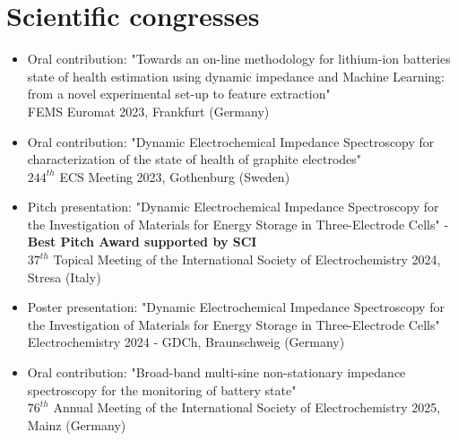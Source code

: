 \section*{Scientific congresses}
\begin{itemize}
\item {\large Oral contribution: "Towards an on-line methodology for lithium-ion batteries state of health estimation using dynamic impedance and Machine Learning: from a novel experimental set-up to feature extraction"}\\
FEMS Euromat 2023, Frankfurt (Germany) 

\item {\large Oral contribution: "Dynamic Electrochemical Impedance Spectroscopy for characterization of the state of health of graphite electrodes"}\\
$\mathrm{244}^{th}$ ECS Meeting 2023, Gothenburg (Sweden)

\item {\large Pitch presentation: "Dynamic Electrochemical Impedance Spectroscopy for the Investigation of Materials for Energy Storage in Three-Electrode Cells" - \textbf{Best Pitch Award supported by SCI} }\\
$\mathrm{37}^{th}$ Topical Meeting of the International Society of Electrochemistry 2024, Stresa (Italy)

\item {\large Poster presentation: "Dynamic Electrochemical Impedance Spectroscopy for the Investigation of Materials for Energy Storage in Three-Electrode Cells"}\\
Electrochemistry 2024 - GDCh, Braunschweig (Germany)

\item {\large Oral contribution: "Broad-band multi-sine non-stationary impedance spectroscopy for the monitoring of battery state"}\\
$\mathrm{76}^{th}$ Annual Meeting of the International Society of Electrochemistry 2025, Mainz (Germany)

\end{itemize}